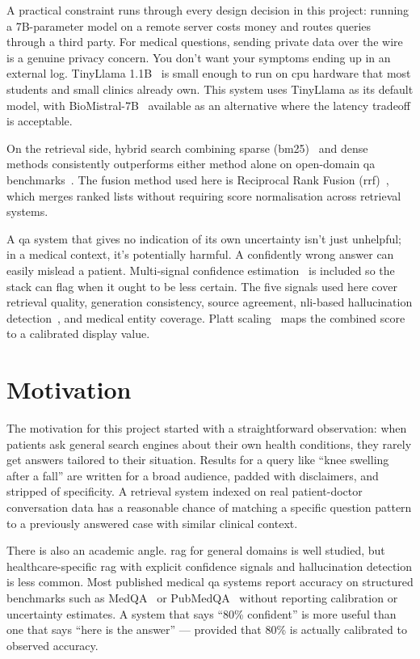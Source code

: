 A practical constraint runs through every design decision in this project: running a 7B-parameter model on a remote server costs money and routes queries through a third party. For medical questions, sending private data over the wire is a genuine privacy concern. You don't want your symptoms ending up in an external log. TinyLlama 1.1B~\cite{zhang2024tinyllama} is small enough to run on \ac{cpu} hardware that most students and small clinics already own. This system uses TinyLlama as its default model, with BioMistral-7B~\cite{labrak2024biomistral} available as an alternative where the latency tradeoff is acceptable.

On the retrieval side, hybrid search combining sparse (\ac{bm25})~\cite{robertson2009bm25} and dense~\cite{reimers2019sbert} methods consistently outperforms either method alone on open-domain \ac{qa} benchmarks~\cite{ma2022hybrid}. The fusion method used here is Reciprocal Rank Fusion (\ac{rrf})~\cite{cormack2009rrf}, which merges ranked lists without requiring score normalisation across retrieval systems.

A \ac{qa} system that gives no indication of its own uncertainty isn't just unhelpful; in a medical context, it's potentially harmful. A confidently wrong answer can easily mislead a patient. Multi-signal confidence estimation~\cite{guo2017calibration} is included so the stack can flag when it ought to be less certain. The five signals used here cover retrieval quality, generation consistency, source agreement, \ac{nli}-based hallucination detection~\cite{he2021deberta}, and medical entity coverage. Platt scaling~\cite{platt1999probabilistic} maps the combined score to a calibrated display value.

\section{Motivation}

The motivation for this project started with a straightforward observation: when patients ask general search engines about their own health conditions, they rarely get answers tailored to their situation. Results for a query like ``knee swelling after a fall'' are written for a broad audience, padded with disclaimers, and stripped of specificity. A retrieval system indexed on real patient-doctor conversation data has a reasonable chance of matching a specific question pattern to a previously answered case with similar clinical context.

There is also an academic angle. \ac{rag} for general domains is well studied, but healthcare-specific \ac{rag} with explicit confidence signals and hallucination detection is less common. Most published medical \ac{qa} systems report accuracy on structured benchmarks such as MedQA~\cite{jin2021medqa} \allowbreak{}or PubMedQA~\cite{jin2019pubmedqa} without reporting calibration or uncertainty estimates. A system that says ``80\% confident'' is more useful than one that says ``here is the answer'' --- provided that 80\% is actually calibrated to observed accuracy.

